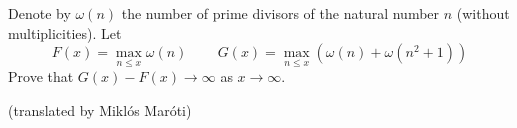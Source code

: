 Denote by $\omega (n)$ the number of prime divisors of the natural number $n$ (without multiplicities). Let
$$F(x)=\max_{n\leq x} \omega (n) \,\,\,\,\,\,\,\,\,\,\,\,\, G(x)=\max_{n\leq x} \left( \omega (n) + \omega (n^2+1)\right)$$Prove that $G(x)-F(x)\to \infty$ as $x\to\infty$.

(translated by Miklós Maróti)